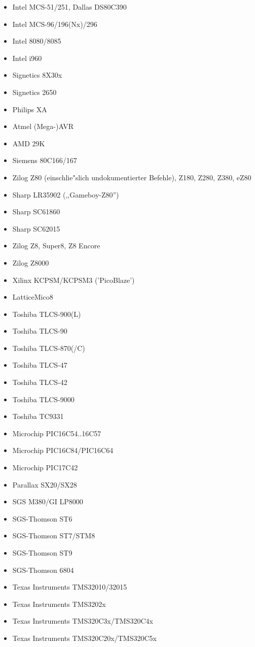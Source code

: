 \documentclass[12pt,a4paper,twoside]{report}
\begin{document}
\begin{itemize}
{      OKI-Varianten}
\item{Intel MCS-51/251, Dallas DS80C390}
\item{Intel MCS-96/196(Nx)/296}
\item{Intel 8080/8085}
\item{Intel i960}
\item{Signetics 8X30x}
\item{Signetics 2650}
\item{Philips XA}
\item{Atmel (Mega-)AVR}
\item{AMD 29K}
\item{Siemens 80C166/167}
\item{Zilog Z80 (einschlie"slich undokumentierter Befehle), Z180, Z280, Z380, eZ80}
\item{Sharp LR35902 (,,Gameboy-Z80'')}
\item{Sharp SC61860}
\item{Sharp SC62015}
\item{Zilog Z8, Super8, Z8 Encore}
\item{Zilog Z8000}
\item{Xilinx KCPSM/KCPSM3 ('PicoBlaze')}
\item{LatticeMico8}
\item{Toshiba TLCS-900(L)}
\item{Toshiba TLCS-90}
\item{Toshiba TLCS-870(/C)}
\item{Toshiba TLCS-47}
\item{Toshiba TLCS-42}
\item{Toshiba TLCS-9000}
\item{Toshiba TC9331}
\item{Microchip PIC16C54..16C57}
\item{Microchip PIC16C84/PIC16C64}
\item{Microchip PIC17C42}
\item{Parallax SX20/SX28}
\item{SGS M380/GI LP8000}
\item{SGS-Thomson ST6}
\item{SGS-Thomson ST7/STM8}
\item{SGS-Thomson ST9}
\item{SGS-Thomson 6804}
\item{Texas Instruments TMS32010/32015}
\item{Texas Instruments TMS3202x}
\item{Texas Instruments TMS320C3x/TMS320C4x}
\item{Texas Instruments TMS320C20x/TMS320C5x}

\end{itemize}
\end{document}
